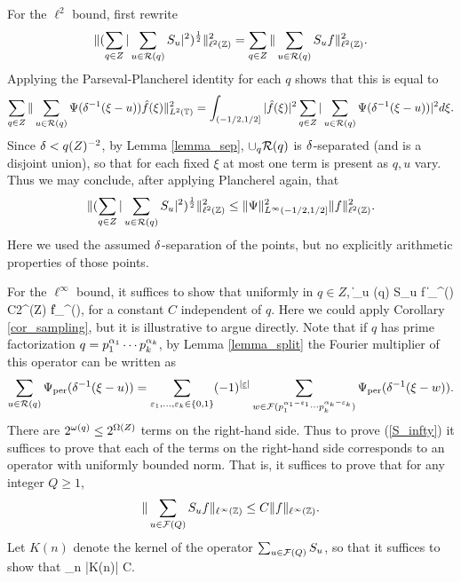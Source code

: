 \documentclass[oneside,11pt]{amsart}
\newcommand{\Rcal}{\mathcal{R}}
\begin{document}
For the $\ell^2$ bound, first rewrite
\[ \| (\sum_{q \in Z}  |  \sum_{u \in \Rcal(q)} S_u|^{2})^{\frac{1}{2}}\|_{\ell^2(\Z)}^2=
\sum_{q \in Z}    \|   \sum_{u \in \Rcal(q)} S_u f\|_{\ell^2(\Z)}^2.
 \]
Applying the Parseval-Plancherel identity for each $q$ shows that this is equal to
\[ \sum_{q \in Z}  \|  \sum_{u \in \Rcal(q)} \Psi(\del^{-1}(\xi - u)) \hat{f}(\xi)\|_{L^2(\T)}^2
 =  \int_{(-1/2,1/2]}  | \hat{f}(\xi)|^2\sum_{q \in Z}| \sum_{u \in \Rcal(q)} \Psi(\del^{-1}(\xi - u))|^2d\xi.\]
Since $\delta< q(Z)^{-2}$, by Lemma \ref{lemma_sep},  $\union_q \Rcal(q)$ is $\delta$-separated (and is a disjoint union), so that for each fixed $\xi$ at most one term is present as $q,u$ vary. Thus we may conclude, after applying Plancherel again, that 
\[ \| (\sum_{q \in Z}  |  \sum_{u \in \Rcal(q)} S_u|^{2})^{\frac{1}{2}}\|_{\ell^2(\Z)}^2  \leq \| \Psi \|^2_{L^\infty(-1/2,1/2]} \| f \|_{\ell^2(\Z)}^2.\]
Here we used the assumed $\delta$-separation of the points, but no explicitly arithmetic properties of those points.
 
 For the $\ell^\infty$   bound, it suffices to show that uniformly in $q \in Z$, 
 \beq\label{S_infty}
   \|  \sum_{u \in \Rcal(q)} S_u  f \|_{\ell^\infty(\Z)}
	\leq C2^{\Omega(Z)} \| f\|_{\ell^{\infty}(\Z)},
	\eeq
	for a constant $C$ independent of $q$. Here we could apply Corollary \ref{cor_sampling}, but it is illustrative  to argue directly.
 Note that if $q$ has prime factorization $q=p_1^{\alpha_1} \cdots p_k^{\alpha_k}$,  by Lemma \ref{lemma_split} the Fourier multiplier of this operator can be written as 
 \[ \sum_{u  \in \Rcal(q)} \Psi_{\mathrm{per}}(\del^{-1}(\xi - u)) = 
  \sum_{\ep_1, \ldots, \ep_k \in \{0,1\}} (-1)^{|\underline{\ep}|} \sum_{w \in \Fcal(p_1^{\al_1-\ep_1} \cdots p_k^{\al_k - \ep_k})} \Psi_{\mathrm{per}}(\del^{-1}(\xi-w)).
 \]
 There are $2^{\omega(q)} \leq 2^{\Omega(Z)}$ terms on the right-hand side.
 Thus to prove (\ref{S_infty}) it suffices to prove that each of the terms on the right-hand side corresponds to an operator with uniformly bounded norm. That is, it suffices to prove that for any integer $Q \geq 1$,
 \[\| \sum_{u \in \mathcal{F}(Q)} S_u f \|_{\ell^\infty(\mathbb{Z})} \leq C\|f\|_{\ell^\infty(\mathbb{Z})}.\]
  Let $K(n)$ denote the kernel of the operator $\sum_{u \in \mathcal{F}(Q)} S_u$, so that it suffices to show that 
 \beq\label{K_bound}
  \sum_{n \in \Z} |K(n)| \leq C.
  \eeq
 
\end{document}
